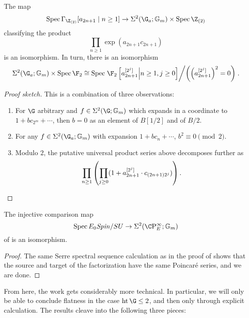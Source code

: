 \begin{lemma}
The map \[\Spec \Gamma_{\Z_{(2)}}[a_{2n + 1} \mid n \ge 1] \to \Sigma^2(\G_a; \Gm) \times \Spec \Z_{(2)}\] classifying the product \[\prod_{n \ge 1} \exp(a_{2n+1} c_{2n+1})\] is an isomorphism.  In turn, there is an isomorphism \[\Sigma^2(\G_a; \Gm) \times \Spec \F_2 \cong \Spec \left.\F_2\left[a_{2n+1}^{[2^j]} \middle| n \ge 1, j \ge 0\right] \middle/ \left(\left(a_{2n+1}^{[2^j]}\right)^2 = 0\right)\right. .\]
\end{lemma}
\begin{proof}[Proof sketch]
This is a combination of three observations:
\begin{enumerate}
    \item For $\G$ arbitrary and $f \in \Sigma^2(\G; \Gm)$ which expands in a coordinate to $1 + b c_{2^m} + \cdots$, then $b = 0$ as an element of $B[1/2]$ and of $B/2$.
    \item For any $f \in \Sigma^2(\G_a; \Gm)$ with expansion $1 + b c_n + \cdots$, $b^2 \equiv 0 \pmod{2}$.
    \item Modulo $2$, the putative universal product series above decomposes further as \[\prod_{n \ge 1} \left(\prod_{j \ge 0} (1 + a_{2n+1}^{[2^j]} \cdot c_{(2n+1)2^j})\right). \qedhere\]
\end{enumerate}
\end{proof}

\begin{corollary}
The injective comparison map \[\Spec E_0 \Spin/SU \to \Sigma^2(\CP^\infty_E; \Gm)\] of  is an isomorphism.
\end{corollary}
\begin{proof}
The same Serre spectral sequence calculation as in the proof of  shows that the source and target of the factorization have the same Poincar\'e series, and we are done.
\end{proof}

From here, the work gets considerably more technical.  In particular, we will only be able to conclude flatness in the case $\height \G \le 2$, and then only through explicit calculation.  The results cleave into the following three pieces:

